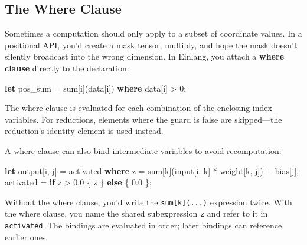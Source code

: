 \documentclass[11pt,titlepage]{article}
\newenvironment{Shaded}{}{}
\newcommand{\DecValTok}[1]{\textcolor[rgb]{0.25,0.63,0.44}{#1}}
\newcommand{\KeywordTok}[1]{\textcolor[rgb]{0.00,0.44,0.13}{\textbf{#1}}}
\newcommand{\NormalTok}[1]{#1}
\newcommand{\OperatorTok}[1]{\textcolor[rgb]{0.40,0.40,0.40}{#1}}
\begin{document}
\vspace{2em}

\hypertarget{the-where-clause}{%
\subsection{The Where Clause}\label{the-where-clause}}

Sometimes a computation should only apply to a subset of coordinate
values. In a positional API, you'd create a mask tensor, multiply, and
hope the mask doesn't silently broadcast into the wrong dimension. In
Einlang, you attach a \textbf{where clause} directly to the declaration:

\begin{Shaded}
\begin{Highlighting}[]
\KeywordTok{let}\NormalTok{ pos_sum = sum}\OperatorTok{[}\NormalTok{i}\OperatorTok{]}\NormalTok{(data}\OperatorTok{[}\NormalTok{i}\OperatorTok{]}\NormalTok{) }\KeywordTok{where}\NormalTok{ data}\OperatorTok{[}\NormalTok{i}\OperatorTok{]}\NormalTok{ > }\DecValTok{0}\NormalTok{;}
\end{Highlighting}
\end{Shaded}

The where clause is evaluated for each combination of the enclosing
index variables. For reductions, elements where the guard is false are
skipped---the reduction's identity element is used instead.

A where clause can also bind intermediate variables to avoid
recomputation:

\begin{Shaded}
\begin{Highlighting}[]
\KeywordTok{let}\NormalTok{ output}\OperatorTok{[}\NormalTok{i, j}\OperatorTok{]}\NormalTok{ = activated}
    \KeywordTok{where}\NormalTok{ z = sum}\OperatorTok{[}\NormalTok{k}\OperatorTok{]}\NormalTok{(input}\OperatorTok{[}\NormalTok{i, k}\OperatorTok{]}\NormalTok{ * weight}\OperatorTok{[}\NormalTok{k, j}\OperatorTok{]}\NormalTok{) + bias}\OperatorTok{[}\NormalTok{j}\OperatorTok{]}\NormalTok{,}
\NormalTok{          activated = }\KeywordTok{if}\NormalTok{ z > }\DecValTok{0.0} \OperatorTok{\{}\NormalTok{ z }\OperatorTok{\}} \KeywordTok{else} \OperatorTok{\{} \DecValTok{0.0} \OperatorTok{\}}\NormalTok{;}
\end{Highlighting}
\end{Shaded}

Without the where clause, you'd write the \texttt{sum{[}k{]}(...)}
expression twice. With the where clause, you name the shared
subexpression \texttt{z} and refer to it in \texttt{activated}. The
bindings are evaluated in order; later bindings can reference earlier
ones.
\end{document}
